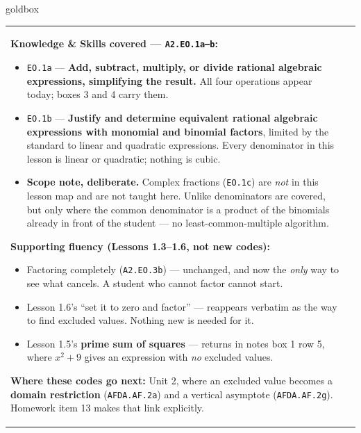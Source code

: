 \documentclass[10pt]{article}
\begin{document}
\renewcommand{\arraystretch}{1.6}
\begin{skillbox}{goldbox}
\begin{tabularx}{\linewidth}{@{}X|X@{}}
\begin{minipage}[t]{\linewidth}\vspace{0pt}
\textbf{Knowledge \& Skills covered --- \texttt{A2.EO.1a--b}:}
\begin{itemize}[leftmargin=1.1em, itemsep=2pt, topsep=2pt]
  \item \texttt{EO.1a} --- \textbf{Add, subtract, multiply, or divide rational algebraic
        expressions, simplifying the result.} All four operations appear today; boxes 3 and 4 carry
        them.
  \item \texttt{EO.1b} --- \textbf{Justify and determine equivalent rational algebraic expressions
        with monomial and binomial factors}, limited by the standard to linear and quadratic
        expressions. Every denominator in this lesson is linear or quadratic; nothing is cubic.
  \item \textbf{Scope note, deliberate.} Complex fractions (\texttt{EO.1c}) are \emph{not} in this
        lesson map and are not taught here. Unlike denominators are covered, but only where the
        common denominator is a product of the binomials already in front of the student --- no
        least-common-multiple algorithm.
\end{itemize}
\textbf{Supporting fluency (Lessons 1.3--1.6, not new codes):}
\begin{itemize}[leftmargin=1.1em, itemsep=2pt, topsep=2pt]
  \item Factoring completely (\texttt{A2.EO.3b}) --- unchanged, and now the \emph{only} way to see
        what cancels. A student who cannot factor cannot start.
  \item Lesson 1.6's ``set it to zero and factor'' --- reappears verbatim as the way to find
        excluded values. Nothing new is needed for it.
  \item Lesson 1.5's \textbf{prime sum of squares} --- returns in notes box 1 row 5, where
        $x^2+9$ gives an expression with \emph{no} excluded values.
\end{itemize}
\textbf{Where these codes go next:} Unit 2, where an excluded value becomes a \textbf{domain
restriction} (\texttt{AFDA.AF.2a}) and a vertical asymptote (\texttt{AFDA.AF.2g}). Homework item 13
makes that link explicitly.
\end{minipage}
&
\begin{minipage}[t]{\linewidth}\vspace{0pt}

\end{minipage}
\end{tabularx}
\end{skillbox}
\end{document}
